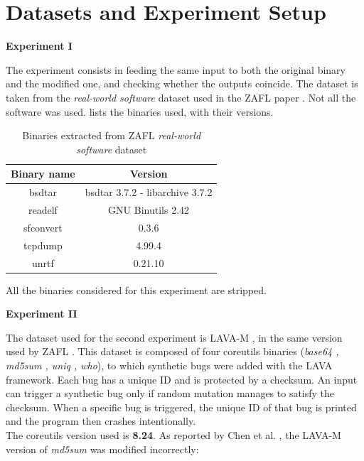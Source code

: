 \section{Datasets and Experiment Setup}\label{sec:datasets_setup}
    \begin{center}
        \textbf{Experiment I}
    \end{center}
    The experiment consists in feeding the same input to both the original binary and the modified one, 
    and checking whether the outputs coincide. The dataset is taken from the \textit{real-world software} dataset used in the ZAFL 
    paper \cite{zafl}. Not all the software was used.  lists the binaries 
    used, with their versions.
    \begin{table}[ht]
        \centering
        \caption{Binaries extracted from ZAFL \textit{real-world software} dataset}
        \label{tab:experiment1Dataset}
        \begin{tabular}{c|c}
            Binary name & Version \\
            \hline
            bsdtar & bsdtar 3.7.2 - libarchive 3.7.2 \\
            \hline
            readelf & GNU Binutils 2.42\\
            \hline
            sfconvert & 0.3.6\\
            \hline
            tcpdump & 4.99.4\\
            \hline 
            unrtf & 0.21.10\\

        \end{tabular}
    \end{table}
    All the binaries considered for this experiment are stripped.
     \begin{center}
        \textbf{Experiment II}
    \end{center}
    The dataset used for the second experiment is LAVA-M \cite{lava}, in the same version used by ZAFL \cite{zafl}.
    This dataset is composed of four coreutils binaries (\textit{base64 , md5sum , uniq , who}), to which synthetic bugs 
    were added with the LAVA framework. Each bug has a unique ID and is protected by a checksum.
    An input can trigger a synthetic bug only if random mutation manages to satisfy the checksum.
    When a specific bug is triggered, the unique ID of that bug is printed and the program then crashes intentionally.\\ 
    The coreutils version used is \textbf{8.24}.
    As reported by Chen et al. \cite{Angora}, the LAVA-M version of \textit{md5sum} was modified incorrectly: 
